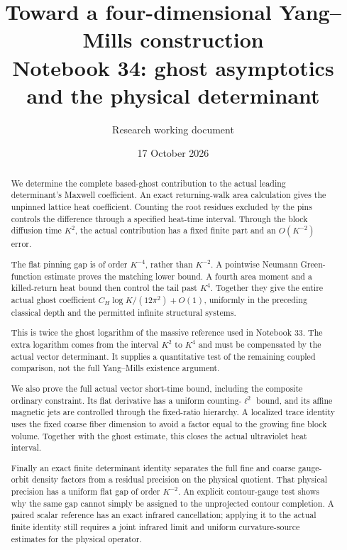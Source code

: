 \documentclass[11pt]{article}
\title{Toward a four-dimensional Yang--Mills construction\\
\large Notebook 34: ghost asymptotics and the physical determinant}
\author{Research working document}
\date{17 October 2026}
\theoremstyle{remark}
\begin{document}
\maketitle
\begin{abstract}
We determine the complete based-ghost contribution to the
actual leading determinant's Maxwell coefficient. An exact
returning-walk area calculation gives the unpinned lattice
heat coefficient. Counting the root residues excluded by
the pins controls the difference through a specified
heat-time interval. Through the block diffusion time
\(K^2\), the actual contribution has a fixed finite part
and an \(O(K^{-2})\) error.

The flat pinning gap is of order \(K^{-4}\), rather than
\(K^{-2}\). A pointwise Neumann Green-function estimate
proves the matching lower bound. A fourth area moment
and a killed-return heat bound then control the tail
past \(K^4\). Together they give the entire actual ghost
coefficient \(C_H\log K/(12\pi^2)+O(1)\), uniformly in
the preceding classical depth and the permitted infinite
structural systems.

This is twice the ghost logarithm of the massive reference
used in Notebook 33. The extra logarithm comes from the
interval \(K^2\) to \(K^4\) and must be compensated by the
actual vector determinant. It supplies a quantitative
test of the remaining coupled comparison, not the full
Yang--Mills existence argument.

We also prove the full actual vector short-time bound,
including the composite ordinary constraint. Its flat
derivative has a uniform counting-\(\ell^2\) bound,
and its affine magnetic jets are controlled through
the fixed-ratio hierarchy. A localized trace identity
uses the fixed coarse fiber dimension to avoid a
factor equal to the growing fine block volume.
Together with the ghost estimate, this closes the
actual ultraviolet heat interval.

Finally an exact finite determinant identity separates
the full fine and coarse gauge-orbit density factors
from a residual precision on the physical quotient.
That physical precision has a uniform flat gap of
order \(K^{-2}\). An explicit contour-gauge test shows
why the same gap cannot simply be assigned to the
unprojected contour completion. A paired scalar
reference has an exact infrared cancellation; applying
it to the actual finite identity still requires a
joint infrared limit and uniform curvature-source
estimates for the physical operator.
\end{abstract}
\end{document}
